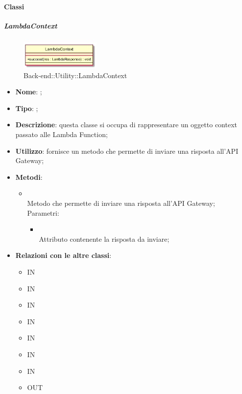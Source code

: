 \paragraph{Classi}
\hypertarget{LambdaContext_label}{\subparagraph{LambdaContext}}
\begin{figure}[h]
	\centering
	\includegraphics[width=0.35\textwidth,height=\textheight,keepaspectratio]{images/ClassLambdaContext.png}
	\caption{Back-end::Utility::LambdaContext}
\end{figure}
\begin{itemize}
	\item \textbf{Nome}: ;
	\item \textbf{Tipo}: ;
	\item \textbf{Descrizione}: questa classe si occupa di rappresentare un oggetto context passato alle Lambda Function;
	\item \textbf{Utilizzo}: fornisce un metodo che permette di inviare una risposta all'API Gateway;
	\item \textbf{Metodi}:
	\begin{itemize}
		\item[]  \\		Metodo che permette di inviare una risposta all'API Gateway;\\
		Parametri:
		\begin{itemize}
			\item {} \\
			Attributo contenente la risposta da inviare;
		\end{itemize}
	\end{itemize}
	\item \textbf{Relazioni con le altre classi}:
	\begin{itemize}
		\item IN \hyperlink{NotificationService_label}{}
		\item IN \hyperlink{UsersService_label}{}
		\item IN \hyperlink{VAService_label}{}
		\item IN \hyperlink{<<interface>> WebhookService_label}{}
		\item IN \hyperlink{RulesService_label}{}
		\item IN \hyperlink{ConversationWebhookService_label}{}
		\item IN \hyperlink{VocalAPI_label}{}
		\item OUT \hyperlink{LambdaResponse_label}{}
	\end{itemize}
\end{itemize}
\FloatBarrier

